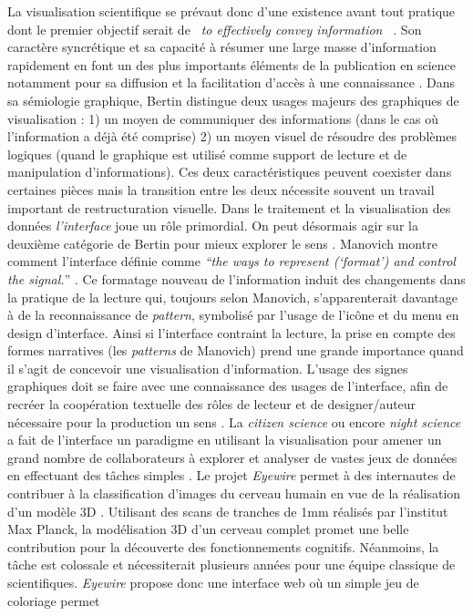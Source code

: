 La visualisation scientifique se prévaut donc d{\textquoteright}une existence avant tout pratique dont le premier objectif serait de \textit{{\guillemotleft}~to effectively convey information~{\guillemotright}} \citep{Kelleher2011}. Son caractère syncrétique et sa capacité à résumer une large masse d{\textquoteright}information rapidement en font un des plus importants éléments de la publication en science notamment pour sa diffusion et la facilitation d{\textquoteright}accès à une connaissance \citep{Ware2004}. Dans sa sémiologie graphique, Bertin \citep{Bertin1977} distingue deux usages majeurs des graphiques de visualisation : 1) un moyen de communiquer des informations (dans le cas o\`u l{\textquoteright}information a déjà été comprise) 2) un moyen visuel de résoudre des problèmes logiques (quand le graphique est utilisé comme support de lecture et de manipulation d{\textquoteright}informations). Ces deux caractéristiques peuvent coexister dans certaines pièces mais la transition entre les deux nécessite souvent un travail important de restructuration visuelle. Dans le traitement et la visualisation des données \textit{l{\textquoteright}interface }joue un r\^ole primordial. On peut désormais agir sur la deuxième catégorie de Bertin pour mieux explorer le sens \citep{Weissberg2007}. Manovich montre comment l{\textquoteright}interface définie comme \textit{{\textquotedblleft}the ways to represent ({\textquoteleft}format{\textquoteright}) and control the signal.}{\textquotedblright} \citep{Manovich2013}. Ce formatage nouveau de l{\textquoteright}information induit des changements dans la pratique de la lecture qui, toujours selon Manovich, s{\textquoteright}apparenterait davantage à de la reconnaissance de \textit{pattern}, symbolisé par l{\textquoteright}usage de l{\textquoteright}ic\^one et du menu en design d{\textquoteright}interface. Ainsi si l{\textquoteright}interface contraint la lecture, la prise en compte des formes narratives (les \textit{patterns} de Manovich) prend une grande importance quand il s{\textquoteright}agit de concevoir une visualisation d{\textquoteright}information. L{\textquoteright}usage des signes graphiques doit se faire avec une connaissance des usages de l{\textquoteright}interface, afin de recréer la coopération textuelle des r\^oles de lecteur et de designer/auteur nécessaire pour la production un sens \citep{Eco1985}. La \textit{citizen science} ou encore \textit{night science} a fait de l{\textquoteright}interface un paradigme en utilisant la visualisation pour amener un grand nombre de collaborateurs à explorer et analyser de vastes jeux de données en effectuant des t\^aches simples \citep{Silvertown2009}. Le projet \textit{Eyewire} permet à des internautes de contribuer à la classification d{\textquoteright}images du cerveau humain en vue de la réalisation d{\textquoteright}un modèle 3D \citep{Seung2012}. Utilisant des scans de tranches de 1mm réalisés par l{\textquoteright}institut Max Planck, la modélisation 3D d{\textquoteright}un cerveau complet promet une belle contribution pour la découverte des fonctionnements cognitifs. Néanmoins, la t\^ache est colossale et nécessiterait plusieurs années pour une équipe classique de scientifiques. \textit{Eyewire} propose donc une interface web o\`u un simple jeu de coloriage permet 